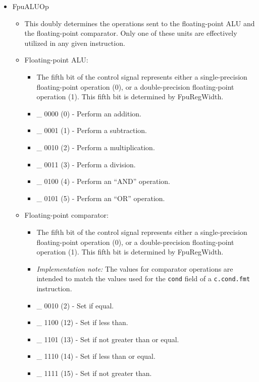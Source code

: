 \documentclass[
    paper=letter,
    parskip=half,
    fontsize=12pt,
    titlepage=firstiscover,
    toc=bibliography,
    numbers=endperiod
]{scrartcl}
\providecommand{\tightlist}{%
  \setlength{\itemsep}{0pt}\setlength{\parskip}{0pt}}
\begin{document}
\begin{itemize}
    \item FpuALUOp
          \begin{itemize}
              \tightlist
              \item This doubly determines the operations sent to the floating-point ALU and
                    the floating-point comparator. Only one of these units are effectively
                    utilized in any given instruction.
              \item Floating-point ALU:
                    \begin{itemize}
                        \tightlist
                        \item The fifth bit of the control signal represents either a single-precision
                              floating-point operation (0), or a double-precision floating-point
                              operation (1). This fifth bit is determined by FpuRegWidth.
                        \item \_ 0000 (0) - Perform an addition.
                        \item \_ 0001 (1) - Perform a subtraction.
                        \item \_ 0010 (2) - Perform a multiplication.
                        \item \_ 0011 (3) - Perform a division.
                        \item \_ 0100 (4) - Perform an ``AND'' operation.
                        \item \_ 0101 (5) - Perform an ``OR'' operation.
                    \end{itemize}
              \item Floating-point comparator:
                    \begin{itemize}
                        \tightlist
                        \item The fifth bit of the control signal represents either a single-precision
                              floating-point operation (0), or a double-precision floating-point
                              operation (1). This fifth bit is determined by FpuRegWidth.
                        \item \textit{Implementation note:} The values for comparator operations are
                              intended to match the values used for the \texttt{cond} field of a
                              \texttt{c.cond.fmt} instruction.
                        \item \_ 0010 (2) - Set if equal.
                        \item \_ 1100 (12) - Set if less than.
                        \item \_ 1101 (13) - Set if not greater than or equal.
                        \item \_ 1110 (14) - Set if less than or equal.
                        \item \_ 1111 (15) - Set if not greater than.
                    \end{itemize}
          \end{itemize}


\end{itemize}
\end{document}
